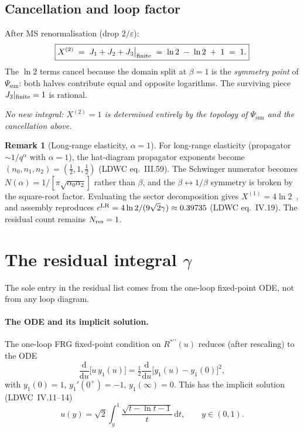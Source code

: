 \documentclass[10pt,a4paper,twocolumn]{article}
\theoremstyle{plain}
\theoremstyle{definition}
\newtheorem{remark}{Remark}
\newcommand{\dd}{\mathrm{d}}
\renewcommand{\Psi}{\varPsi}
\newcommand{\eps}{\varepsilon}
\newcommand{\Nres}{N_{\rm res}}
\begin{document}
\subsection{Cancellation and loop factor}

After MS renormalisation (drop $2/\eps$):
\begin{equation}\label{eq:X2}
  \boxed{
    X^{(2)}
    \;=\; J_1 + J_2 + J_3\big|_{\rm finite}
    \;=\; \ln 2 \;-\; \ln 2 \;+\; 1
    \;=\; 1.
  }
\end{equation}
The $\ln 2$ terms cancel because the domain split at $\beta = 1$ is
the \emph{symmetry point} of $\Psi_{\text{sun}}$: both halves
contribute equal and opposite logarithms.  The surviving piece
$J_3|_{\rm finite} = 1$ is rational.

\emph{No new integral: $X^{(2)} = 1$ is determined entirely by
the topology of $\Psi_{\text{sun}}$ and the cancellation above.}

\begin{remark}[Long-range elasticity, $\alpha=1$]
For long-range elasticity (propagator $\sim 1/q^\alpha$ with
$\alpha=1$), the hat-diagram propagator exponents become
$(n_0, n_1, n_2) = (\tfrac{1}{2}, 1, \tfrac{1}{2})$ (LDWC
eq.~III.59).  The Schwinger numerator becomes
$N(\alpha) = 1/[\pi\sqrt{\alpha_0\alpha_2}]$ rather than $\beta$,
and the $\beta\leftrightarrow 1/\beta$ symmetry is broken
by the square-root factor.  Evaluating the sector decomposition
gives $X^{(1)} = 4\ln 2$~\citep[eq.~III.62]{LDWC2002}, and
assembly reproduces $c^{\rm LR} = 4\ln 2/(9\sqrt{2}\gamma)
\approx 0.39735$ (LDWC eq.~IV.19).
The residual count remains $\Nres = 1$.
\end{remark}

\section{The residual integral $\gamma$}
\label{sec:gamma}

The sole entry in the residual list comes from the one-loop
fixed-point ODE, not from any loop diagram.

\paragraph{The ODE and its implicit solution.}
The one-loop FRG fixed-point condition on $R^{*\prime\prime}(u)$
reduces (after rescaling) to the ODE
\begin{equation}\label{eq:ode}
  \frac{\dd}{\dd u}\bigl[u\,y_1(u)\bigr]
  = \tfrac{1}{2}\frac{\dd}{\dd u}\bigl[y_1(u) - y_1(0)\bigr]^2,
\end{equation}
with $y_1(0)=1$, $y_1'(0^+)=-1$, $y_1(\infty)=0$.
This has the implicit solution (LDWC~IV.11--14)
\begin{equation}\label{eq:uy}
  u(y) = \sqrt{2}\int_y^1\!\frac{\sqrt{t-\ln t - 1}}{t}\,\dd t,
  \qquad y \in (0,1).
\end{equation}
\end{document}
